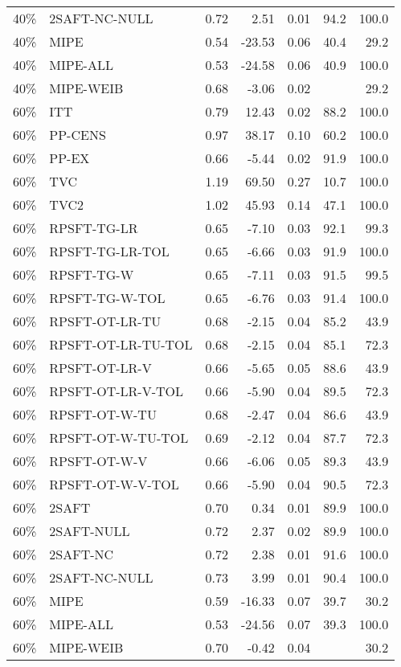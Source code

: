 \begin{table}[ht]
{\begin{tabular}{llrrrrr}
  40\% & 2SAFT-NC-NULL & 0.72 & 2.51 & 0.01 & 94.2 & 100.0 \\ 
  40\% & MIPE & 0.54 & -23.53 & 0.06 & 40.4 & 29.2 \\ 
  40\% & MIPE-ALL & 0.53 & -24.58 & 0.06 & 40.9 & 100.0 \\ 
  40\% & MIPE-WEIB & 0.68 & -3.06 & 0.02 &  & 29.2 \\ 
   \hline
60\% & ITT & 0.79 & 12.43 & 0.02 & 88.2 & 100.0 \\ 
  60\% & PP-CENS & 0.97 & 38.17 & 0.10 & 60.2 & 100.0 \\ 
  60\% & PP-EX & 0.66 & -5.44 & 0.02 & 91.9 & 100.0 \\ 
  60\% & TVC & 1.19 & 69.50 & 0.27 & 10.7 & 100.0 \\ 
  60\% & TVC2 & 1.02 & 45.93 & 0.14 & 47.1 & 100.0 \\ 
   \hline
60\% & RPSFT-TG-LR & 0.65 & -7.10 & 0.03 & 92.1 & 99.3 \\ 
  60\% & RPSFT-TG-LR-TOL & 0.65 & -6.66 & 0.03 & 91.9 & 100.0 \\ 
  60\% & RPSFT-TG-W & 0.65 & -7.11 & 0.03 & 91.5 & 99.5 \\ 
  60\% & RPSFT-TG-W-TOL & 0.65 & -6.76 & 0.03 & 91.4 & 100.0 \\ 
  60\% & RPSFT-OT-LR-TU & 0.68 & -2.15 & 0.04 & 85.2 & 43.9 \\ 
  60\% & RPSFT-OT-LR-TU-TOL & 0.68 & -2.15 & 0.04 & 85.1 & 72.3 \\ 
  60\% & RPSFT-OT-LR-V & 0.66 & -5.65 & 0.05 & 88.6 & 43.9 \\ 
  60\% & RPSFT-OT-LR-V-TOL & 0.66 & -5.90 & 0.04 & 89.5 & 72.3 \\ 
   \hline
60\% & RPSFT-OT-W-TU & 0.68 & -2.47 & 0.04 & 86.6 & 43.9 \\ 
  60\% & RPSFT-OT-W-TU-TOL & 0.69 & -2.12 & 0.04 & 87.7 & 72.3 \\ 
  60\% & RPSFT-OT-W-V & 0.66 & -6.06 & 0.05 & 89.3 & 43.9 \\ 
  60\% & RPSFT-OT-W-V-TOL & 0.66 & -5.90 & 0.04 & 90.5 & 72.3 \\ 
   \hline
60\% & 2SAFT & 0.70 & 0.34 & 0.01 & 89.9 & 100.0 \\ 
  60\% & 2SAFT-NULL & 0.72 & 2.37 & 0.02 & 89.9 & 100.0 \\ 
  60\% & 2SAFT-NC & 0.72 & 2.38 & 0.01 & 91.6 & 100.0 \\ 
  60\% & 2SAFT-NC-NULL & 0.73 & 3.99 & 0.01 & 90.4 & 100.0 \\ 
  60\% & MIPE & 0.59 & -16.33 & 0.07 & 39.7 & 30.2 \\ 
  60\% & MIPE-ALL & 0.53 & -24.56 & 0.07 & 39.3 & 100.0 \\ 
  60\% & MIPE-WEIB & 0.70 & -0.42 & 0.04 &  & 30.2 \\ 
   \hline
\end{tabular}
}
\end{table}
